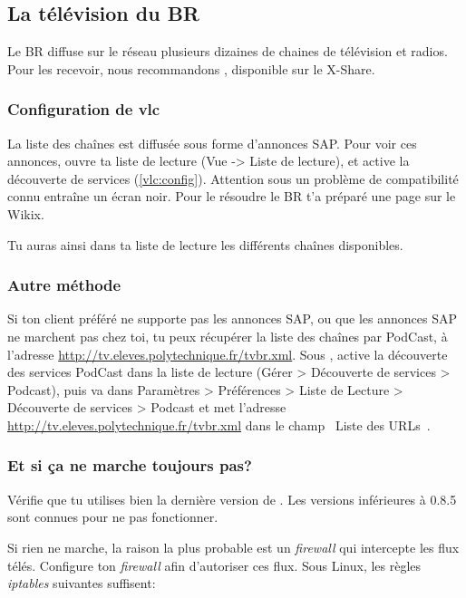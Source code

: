 
\subsection{La t\'el\'evision du BR}
\label{TV}

Le BR diffuse sur le r\'eseau plusieurs dizaines de chaines de t\'el\'evision et radios. Pour les recevoir, nous recommandons , disponible sur le X-Share.

\subsubsection{Configuration de vlc}

La liste des cha\^ines est diffus\'ee sous forme d'annonces SAP. Pour voir ces annonces, ouvre ta liste de lecture (Vue -> Liste de lecture), et active la d\'ecouverte de services (\ref{vlc:config}).
Attention sous  un probl\`eme de compatibilit\'e connu entra\^ine un \'ecran noir. Pour le r\'esoudre le BR t'a pr\'epar\'e une page sur le Wikix.

\label{vlc:config}

Tu auras ainsi dans ta liste de lecture les diff\'erents cha\^{i}nes disponibles.

\subsubsection{Autre m\'ethode}

Si ton client pr\'ef\'er\'e ne supporte pas les annonces SAP, ou que les annonces SAP ne marchent pas chez toi, tu peux r\'ecup\'erer la liste des cha\^ines par
PodCast, à l'adresse \url{http://tv.eleves.polytechnique.fr/tvbr.xml}. Sous , active la d\'ecouverte des services PodCast dans la liste de
lecture (G\'erer > D\'ecouverte de services > Podcast), puis va dans Param\`etres > Pr\'ef\'erences > Liste de Lecture > D\'ecouverte de services > Podcast et
met l'adresse \url{http://tv.eleves.polytechnique.fr/tvbr.xml} dans le champ \guillemotleft~Liste des URLs~\guillemotright .

\subsubsection{Et si ça ne marche toujours pas?}

V\'erifie que tu utilises bien la derni\`ere version de . Les versions inf\'erieures à 0.8.5 sont connues pour ne pas fonctionner.

Si rien ne marche, la raison la plus probable est un \emph{firewall} qui intercepte les flux t\'el\'es. Configure ton \emph{firewall} afin d'autoriser
ces flux. Sous Linux, les r\`egles \emph{iptables} suivantes suffisent:

